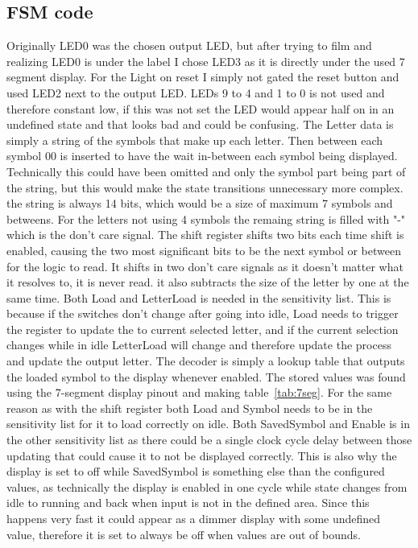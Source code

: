 \documentclass{article}
\begin{document}
\subsection{FSM code}
Originally LED0 was the chosen output LED, but after trying to film and realizing LED0 is under the label I chose LED3 as it is directly under the used 7 segment display. For the Light on reset I simply not gated the reset button and used LED2 next to the output LED. LEDs 9 to 4 and 1 to 0 is not used and therefore constant low, if this was not set the LED would appear half on in an undefined state and that looks bad and could be confusing.
The Letter data is simply a string of the symbols that make up each letter. Then between each symbol 00 is inserted to have the wait in-between each symbol being displayed. Technically this could have been omitted and only the symbol part being part of the string, but this would make the state transitions unnecessary more complex. the string is always 14 bits, which would be a size of maximum 7 symbols and betweens. For the letters not using 4 symbols the remaing string is filled with "-" which is the don't care signal.
\clearpage
{}
The shift register shifts two bits each time shift is enabled, causing the two most significant bits to be the next symbol or between for the logic to read. It shifts in two don't care signals as it doesn't matter what it resolves to, it is never read. it also subtracts the size of the letter by one at the same time. Both Load and LetterLoad is needed in the sensitivity list. This is because if the switches don't change after going into idle, Load needs to trigger the register to update the to current selected letter, and if the current selection changes while in idle LetterLoad will change and therefore update the process and update the output letter.
\clearpage
{}
The decoder is simply a lookup table that outputs the loaded symbol to the display whenever enabled. The stored values was found using the 7-segment display pinout and making table~\ref{tab:7seg}. For the same reason as with the shift register both Load and Symbol needs to be in the sensitivity list for it to load correctly on idle. Both SavedSymbol and Enable is in the other sensitivity list as there could be a single clock cycle delay between those updating that could cause it to not be displayed correctly. This is also why the display is set to off while SavedSymbol is something else than the configured values, as technically the display is enabled in one cycle while state changes from idle to running and back when input is not in the defined area. Since this happens very fast it could appear as a dimmer display with some undefined value, therefore it is set to always be off when values are out of bounds.
\end{document}
